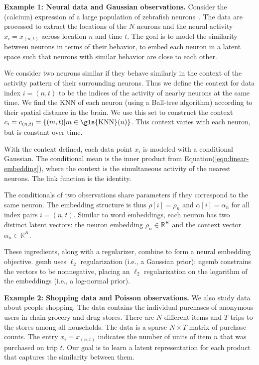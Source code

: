 \documentclass[12pt]{article}
\DeclareRobustCommand{\parhead}[1]{\vspace{0.05in} \textbf{#1} }
\begin{document}
\parhead{Example 1: Neural data and Gaussian observations.} Consider
the (calcium) expression of a large population of zebrafish
neurons~\citep{ahrens2013whole}. The data are processed to extract the
locations of the $N$ neurons and the neural activity $x_i = x_{(n,t)}$
across location $n$ and time $t$. The goal is to model the similarity
between neurons in terms of their behavior, to embed each neuron in a
latent space such that neurons with similar behavior are close to each
other.

We consider two neurons similar if they behave similarly in the
context of the activity pattern of their surrounding neurons. Thus we
define the context for data index $i =(n,t)$ to be the indices of the
activity of nearby neurons at the same time. We find the \gls{KNN} of
each neuron (using a Ball-tree algorithm) according to their spatial
distance in the brain. We use this set to construct the context
$c_i = c_{(n,t)}=\{(m,t) | m \in \text{\gls{KNN}}(n) \}$.  This
context varies with each neuron, but is constant over time.

With the context defined, each data point $x_i$ is modeled with a
conditional Gaussian. The conditional mean is the inner product from
Equation\nobreakspace \textup {(\ref {eqn:linear-embedding})}, where the context is the simultaneous
activity of the nearest neurons. The link function is the identity.

The conditionals of two observations share parameters if they
correspond to the same neuron.  The embedding structure is thus
$\rho[i] = \rho_n$ and $\alpha[i] =\alpha_n$ for all index pairs
$i=(n,t)$. Similar to word embeddings, each neuron has two distinct
latent vectors: the neuron embedding $\rho_n\in\mathbb{R}^K$ and the
context vector $\alpha_n\in\mathbb{R}^K$.

These ingredients, along with a regularizer, combine to form a neural
embedding objective. \gls{gemb} uses $\ell_2$ regularization (i.e., a
Gaussian prior); \gls{ngemb} constrains the vectors to be nonnegative,
placing an $\ell_2$ regularization on the logarithm of the embeddings
(i.e., a log-normal prior).

\parhead{Example 2: Shopping data and Poisson observations.}
We also study data about people shopping. The data contains the
individual purchases of anonymous users in chain grocery and drug
stores. There are $N$ different items and $T$ trips to the stores
among all households. The data is a sparse $N\times T$ matrix of
purchase counts. The entry $x_{i}=x_{(n,t)}$ indicates the number of
units of item $n$ that was purchased on trip $t$. Our goal is to learn
a latent representation for each product that captures the similarity
between them.
\end{document}
